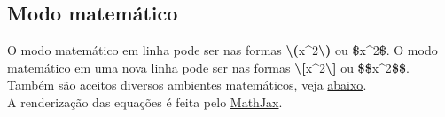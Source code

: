 

\newcommand{\com}[1]{\textbf{\backslash#1}}
\newcommand{\comp}[2]{\textbf{\backslash#1\{#2\}}}
\newcommand{\compp}[3]{\textbf{\backslash#1\{#2\}\{#3\}}}
\newcommand{\comop}[3]{\textbf{\backslash#1[#2]\{#3\}}}

\subsection{Modo matemático}

O modo matemático em linha pode ser nas formas \com{(}x^2\com{)} ou \textbf{\$}x^2\textbf{\$}. O modo matemático em uma nova linha pode ser nas formas \com{[}x^2\com{]} ou \textbf{\$\$}x^2\textbf{\$\$}.\\

Também são aceitos diversos ambientes matemáticos, veja \href{#am}{abaixo}.\\

A renderização das equações é feita pelo \href{mathjax.org}{MathJax}.

